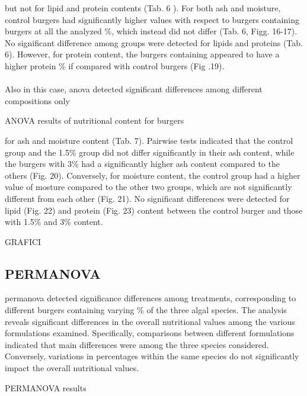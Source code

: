 but not for lipid and protein contents (Tab. 6 ). For both ash and moisture, control burgers had significantly higher values with respect to burgers containing  burgers at all the analyzed \%, which instead did not differ (Tab. 6, Figg. 16-17). No significant difference among groups were detected for lipids and proteins (Tab. 6). However, for protein content, the burgers containing  appeared to have a higher protein \% if compared with control burgers (Fig .19).



\paragraph{}
Also in this case, \gls{anova} detected significant differences among different compositions only

\begin{table}[H]
	\caption{ANOVA results of nutritional content for  burgers}
	\label{tab:anova-palmaria}
	\centering
	\scriptsize
	
\end{table}

for ash and moisture content (Tab. 7). Pairwise tests indicated that the control group and the 1.5\% group did not differ significantly in their ash content, while the burgers with 3\%  had a significantly higher ash content compared to the others (Fig. 20). Conversely, for moisture content, the control group had a higher value of mosture compared to the other two groups, which are not significantly different from each other (Fig. 21). No significant differences were detected for lipid (Fig. 22) and protein (Fig. 23) content between the control burger and those with 1.5\% and 3\% content.



GRAFICI

\subsection{PERMANOVA}
\gls{permanova} detected significance differences among treatments, corresponding to different burgers containing varying \% of the three algal species. The analysis reveals significant differences in the overall nutritional values among the various formulations examined. Specifically, comparisons between different formulations indicated that main differences were among the three species considered. Conversely, variations in percentages within the same species do not significantly impact the overall nutritional values.
\begin{table}[H]
	\caption{PERMANOVA results}
	\label{tab:permanova}
	\centering
	\small
	
\end{table}

